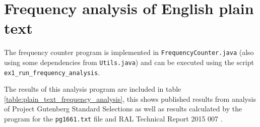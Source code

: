 \documentclass[a4paper]{article}
\title{\DOCTITLE}
\author{\DOCAUTHOR}
\date{\DOCDATE}
\begin{document}
\section{Frequency analysis of English plain text}

The frequency counter program is implemented in \texttt{FrequencyCounter.java}
(also using some dependencies from \texttt{Utils.java}) and can be executed
using the script \texttt{ex1\_run\_frequency\_analysis}.

The results of this analysis program are included in table
\ref{table:plain_text_frequency_analysis}, this shows published results from
analysis of Project Gutenberg Standard Selections \cite{gutenberg} as well as
results calculated by the program for the \texttt{pg1661.txt} file and RAL
Technical Report 2015 007 \cite{ral_tr_2015_007}.
\end{document}
